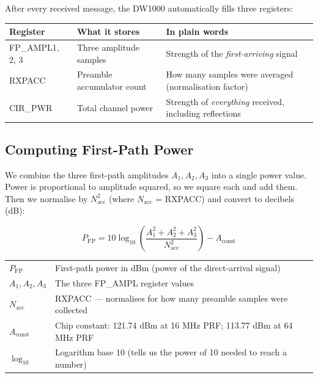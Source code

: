 \documentclass[11pt,a4paper]{article}
\begin{document}
After every received message, the DW1000 automatically fills three registers:

\begin{symbols}
\begin{tabular}{lll}
\textbf{Register} & \textbf{What it stores} & \textbf{In plain words} \\
\midrule
FP\_AMPL1, 2, 3 & Three amplitude samples & Strength of the \emph{first-arriving} signal \\
RXPACC & Preamble accumulator count & How many samples were averaged (normalisation factor) \\
CIR\_PWR & Total channel power & Strength of \emph{everything} received, including reflections \\
\end{tabular}
\end{symbols}

\subsection{Computing First-Path Power}

We combine the three first-path amplitudes $A_1, A_2, A_3$ into a single power value. Power is proportional to amplitude squared, so we square each and add them. Then we normalise by $N_{\text{acc}}^2$ (where $N_{\text{acc}}$ = RXPACC) and convert to decibels (dB):

\begin{equation}
P_{\text{FP}} = 10 \log_{10}\!\left(\frac{A_1^2 + A_2^2 + A_3^2}{N_{\text{acc}}^2}\right) - A_{\text{const}}
\label{eq:fppower}
\end{equation}

\begin{symbols}
\begin{tabular}{ll}
$P_{\text{FP}}$ & First-path power in dBm (power of the direct-arrival signal) \\
$A_1, A_2, A_3$ & The three FP\_AMPL register values \\
$N_{\text{acc}}$ & RXPACC --- normalises for how many preamble samples were collected \\
$A_{\text{const}}$ & Chip constant: 121.74 dBm at 16 MHz PRF; 113.77 dBm at 64 MHz PRF \\
$\log_{10}$ & Logarithm base 10 (tells us the power of 10 needed to reach a number) \\
\end{tabular}
\end{symbols}
\end{document}
